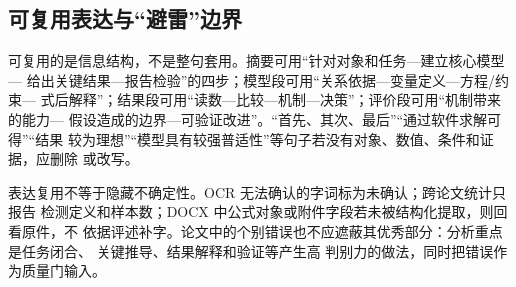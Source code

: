\subsection{可复用表达与“避雷”边界}

可复用的是信息结构，不是整句套用。摘要可用“针对对象和任务—建立核心模型—
给出关键结果—报告检验”的四步；模型段可用“关系依据—变量定义—方程/约束—
式后解释”；结果段可用“读数—比较—机制—决策”；评价段可用“机制带来的能力—
假设造成的边界—可验证改进”。“首先、其次、最后”“通过软件求解可得”“结果
较为理想”“模型具有较强普适性”等句子若没有对象、数值、条件和证据，应删除
或改写。

表达复用不等于隐藏不确定性。OCR 无法确认的字词标为未确认；跨论文统计只报告
检测定义和样本数；DOCX 中公式对象或附件字段若未被结构化提取，则回看原件，不
依据评述补字。论文中的个别错误也不应遮蔽其优秀部分：分析重点是任务闭合、
关键推导、结果解释和验证等产生高
判别力的做法，同时把错误作为质量门输入。

